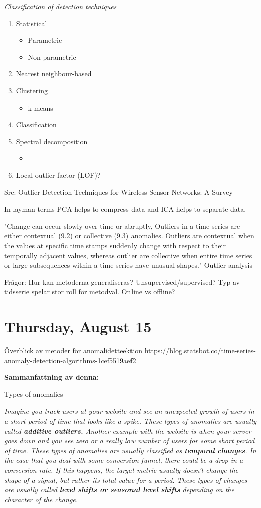 \documentclass[11pt,letterpaper]{article}
\begin{document}
\textit{Classification of detection techniques}
\begin{enumerate}
\item Statistical
\begin{itemize}
\item Parametric
\item Non-parametric
\end{itemize}
\item Nearest neighbour-based
\item Clustering
\begin{itemize}
\item k-means
\end{itemize}
\item Classification
\item Spectral decomposition
\begin{itemize}
\item
\end{itemize}
\item Local outlier factor (LOF)?
\end{enumerate}
Src: Outlier Detection Techniques for Wireless Sensor Networks: A Survey

In layman terms PCA helps to compress data and ICA helps to separate data.

"Change can occur slowly over time or abruptly, Outliers in a time series are either contextual (9.2) or collective (9.3) anomalies. Outliers are contextual when the values at specific time stamps suddenly change with respect to their temporally adjacent values, whereas outlier are collective when entire time series or large subsequences within a time series have unusual shapes." Outlier analysis

Frågor:
Hur kan metoderna generaliseras?
Unsupervised/supervised?
Typ av tidsserie spelar stor roll för metodval.
Online vs offline?

\section*{Thursday, August 15}
Överblick av metoder för anomalidetteektion
https://blog.statsbot.co/time-series-anomaly-detection-algorithms-1cef5519aef2

\textbf{Sammanfattning av denna:}

Types of anomalies

\textit{Imagine you track users at your website and see an unexpected growth of users in a short period of time that looks like a spike. These types of anomalies are usually called \textbf{additive outliers.}
Another example with the website is when your server goes down and you see zero or a really low number of users for some short period of time. These types of anomalies are usually classified as \textbf{temporal changes}.
In the case that you deal with some conversion funnel, there could be a drop in a conversion rate. If this happens, the target metric usually doesn’t change the shape of a signal, but rather its total value for a period. These types of changes are usually called \textbf{level shifts or seasonal level shifts} depending on the character of the change.}
\end{document}
